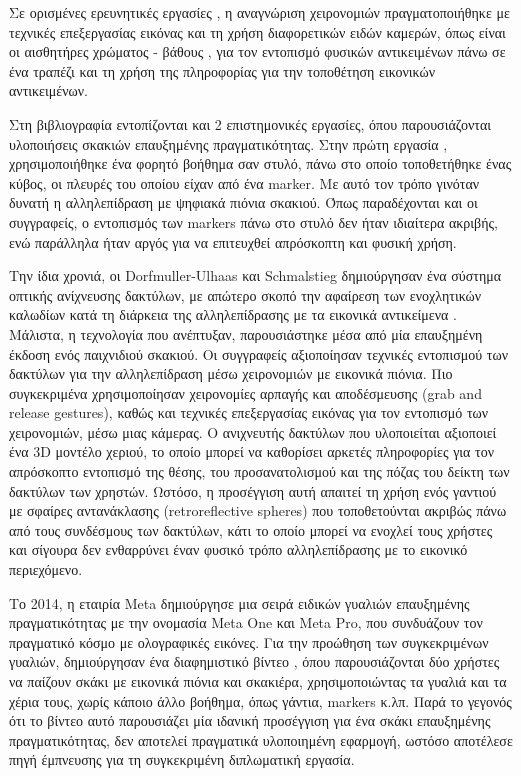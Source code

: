 Σε ορισμένες ερευνητικές εργασίες \cite{Lee2010} \cite{storring2004computer} \cite{Lee20093D} \cite{billinghurst2014hands} \cite{Regenbrecht2013}, η αναγνώριση χειρονομιών πραγματοποιήθηκε με τεχνικές επεξεργασίας εικόνας και τη χρήση διαφορετικών ειδών καμερών, όπως είναι οι αισθητήρες χρώματος - βάθους \cite{clark2011} \cite{Ha2014} \cite{piumsomboon2011} \cite{piumsomboon2014}, για τον εντοπισμό φυσικών αντικειμένων πάνω σε ένα τραπέζι και τη χρήση της πληροφορίας για την τοποθέτηση εικονικών αντικειμένων. 



Στη βιβλιογραφία εντοπίζονται και 2 επιστημονικές εργασίες, όπου παρουσιάζονται υλοποιήσεις σκακιών επαυξημένης πραγματικότητας. Στην πρώτη εργασία \cite{Reitmayr2001}, χρησιμοποιήθηκε ένα φορητό βοήθημα σαν στυλό, πάνω στο οποίο τοποθετήθηκε ένας κύβος, οι πλευρές του οποίου είχαν από ένα marker. Με αυτό τον τρόπο γινόταν δυνατή η αλληλεπίδραση με ψηφιακά πιόνια σκακιού. Όπως παραδέχονται και οι συγγραφείς, ο εντοπισμός των markers πάνω στο στυλό δεν ήταν ιδιαίτερα ακριβής, ενώ παράλληλα ήταν αργός για να επιτευχθεί απρόσκοπτη και φυσική χρήση.


Την ίδια χρονιά, οι Dorfmuller-Ulhaas και Schmalstieg δημιούργησαν ένα σύστημα οπτικής ανίχνευσης δακτύλων, με απώτερο σκοπό την αφαίρεση των ενοχλητικών καλωδίων κατά τη διάρκεια της αλληλεπίδρασης με τα εικονικά αντικείμενα \cite{Dorfmuller-Ulhaas2001}. Μάλιστα, η τεχνολογία που ανέπτυξαν, παρουσιάστηκε μέσα από μία επαυξημένη έκδοση ενός παιχνιδιού σκακιού. Οι συγγραφείς αξιοποίησαν τεχνικές εντοπισμού των δακτύλων για την αλληλεπίδραση μέσω χειρονομιών με εικονικά πιόνια.  Πιο συγκεκριμένα χρησιμοποίησαν χειρονομίες αρπαγής και αποδέσμευσης (grab and release gestures), καθώς και τεχνικές επεξεργασίας εικόνας για τον εντοπισμό των χειρονομιών, μέσω μιας κάμερας. Ο ανιχνευτής δακτύλων που υλοποιείται αξιοποιεί ένα 3D μοντέλο χεριού, το οποίο μπορεί να καθορίσει αρκετές πληροφορίες για τον απρόσκοπτο εντοπισμό της θέσης, του προσανατολισμού και της πόζας του δείκτη των δακτύλων των χρηστών. Ωστόσο, η προσέγγιση αυτή απαιτεί τη χρήση ενός γαντιού με σφαίρες αντανάκλασης (retroreflective spheres) που τοποθετούνται ακριβώς πάνω από τους συνδέσμους των δακτύλων, κάτι το οποίο μπορεί να ενοχλεί τους χρήστες και σίγουρα δεν ενθαρρύνει έναν φυσικό τρόπο αλληλεπίδρασης με το εικονικό περιεχόμενο. 



Το 2014, η εταιρία Meta δημιούργησε μια σειρά ειδικών γυαλιών επαυξημένης πραγματικότητας με την ονομασία Meta One και Meta Pro, που συνδυάζουν τον πραγματικό κόσμο με ολογραφικές εικόνες. Για την προώθηση των συγκεκριμένων γυαλιών, δημιούργησαν ένα διαφημιστικό βίντεο \cite{metaglasses}, όπου παρουσιάζονται δύο χρήστες να παίζουν σκάκι με εικονικά πιόνια και σκακιέρα, χρησιμοποιώντας τα γυαλιά και τα χέρια τους, χωρίς κάποιο άλλο βοήθημα, όπως γάντια, markers κ.λπ. Παρά το γεγονός ότι το βίντεο αυτό παρουσιάζει μία ιδανική προσέγγιση για ένα σκάκι επαυξημένης πραγματικότητας, δεν αποτελεί πραγματικά υλοποιημένη εφαρμογή, ωστόσο αποτέλεσε πηγή έμπνευσης για τη συγκεκριμένη διπλωματική εργασία.


